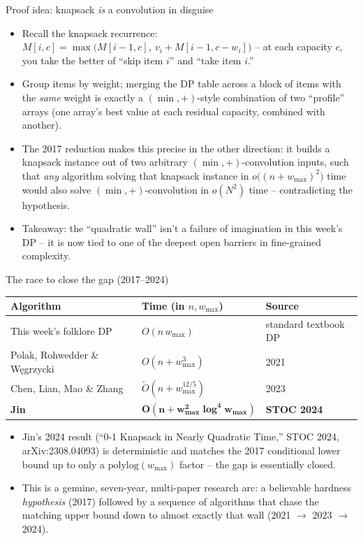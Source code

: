 \documentclass[11pt,aspectratio=169]{beamer}
\begin{document}
\begin{frame}{Proof idea: knapsack \emph{is} a convolution in disguise}
  \small
  \begin{itemize}
    \item Recall the knapsack recurrence: $M[i,c] = \max\big(M[i-1,c],\ v_i +
    M[i-1, c-w_i]\big)$ -- at each capacity $c$, you take the better of ``skip item
    $i$'' and ``take item $i$.''
    \item Group items by weight; merging the DP table across a block of items with the
    \emph{same} weight is exactly a $(\min,+)$-style combination of two ``profile''
    arrays (one array's best value at each residual capacity, combined with another).
    \item The 2017 reduction makes this precise in the other direction: it builds a
    knapsack instance out of two arbitrary $(\min,+)$-convolution inputs, such that
    \emph{any} algorithm solving that knapsack instance in $o\big((n+w_{\max})^{2}\big)$
    time would also solve $(\min,+)$-convolution in $o(N^2)$ time -- contradicting the
    hypothesis.
    \item Takeaway: the ``quadratic wall'' isn't a failure of imagination in this
    week's DP -- it is now tied to one of the deepest open barriers in fine-grained
    complexity.
  \end{itemize}
\end{frame}

\begin{frame}{The race to close the gap (2017--2024)}
  \small
  \begin{center}
  \begin{tabular}{@{}lll@{}}
    \toprule
    Algorithm & Time (in $n, w_{\max}$) & Source \\
    \midrule
    This week's folklore DP & $O(n\,w_{\max})$ & standard textbook DP \\
    Polak, Rohwedder \& Węgrzycki & $O(n + w_{\max}^{3})$ & 2021 \\
    Chen, Lian, Mao \& Zhang & $\widetilde{O}(n + w_{\max}^{12/5})$ & 2023 \\
    \textbf{Jin} & $\boldsymbol{O(n + w_{\max}^{2}\log^{4} w_{\max})}$ & \textbf{STOC 2024}
    \\
    \bottomrule
  \end{tabular}
  \end{center}
  \begin{itemize}
    \item Jin's 2024 result (``0-1 Knapsack in Nearly Quadratic Time,'' STOC 2024,
    arXiv:2308.04093) is deterministic and matches the 2017 conditional lower bound up
    to only a $\mathrm{polylog}(w_{\max})$ factor -- the gap is essentially closed.
    \item This is a genuine, seven-year, multi-paper research arc: a believable
    hardness \emph{hypothesis} (2017) followed by a sequence of algorithms that chase
    the matching upper bound down to almost exactly that wall (2021 $\to$ 2023 $\to$
    2024).
  \end{itemize}
\end{frame}
\end{document}
